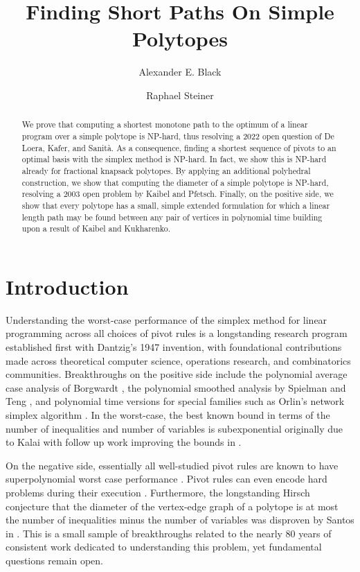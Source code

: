 \documentclass[centering,11pt,reqno]{amsart}
\title{Finding Short Paths On Simple Polytopes}
\author[Black]{Alexander E. Black}
\author[Steiner]{Raphael Steiner}
\theoremstyle{definition}
\newcommand{\NP}{\textsc{NP}}
\begin{document}
	
\maketitle


\begin{abstract}  
We prove that computing a shortest monotone path to the optimum of a linear program over a simple polytope is \NP-hard, thus resolving a 2022 open question of De Loera, Kafer, and Sanit\`{a}. As a consequence, finding a shortest sequence of pivots to an optimal basis with the simplex method is \NP-hard. In fact, we show this is \NP-hard already for fractional knapsack polytopes. By applying an additional polyhedral construction, we show that computing the diameter of a simple polytope is \NP-hard, resolving a 2003 open problem by Kaibel and Pfetsch. Finally, on the positive side, we show that every polytope has a small, simple extended formulation for which a linear length path may be found between any pair of vertices in polynomial time building upon a result of Kaibel and Kukharenko.
\end{abstract}


\section{Introduction}

Understanding the worst-case performance of the simplex method for linear programming across all choices of pivot rules is a longstanding research program established first with Dantzig's 1947 invention, with foundational contributions made across theoretical computer science, operations research, and combinatorics communities. Breakthroughs on the positive side include the polynomial average case analysis of Borgwardt \cite{b87}, the polynomial smoothed analysis by Spielman and Teng \cite{ST04}, and polynomial time versions for special families such as Orlin's network simplex algorithm \cite{OrlinFlows}. In the worst-case, the best known bound in terms of the number of inequalities and number of variables is subexponential originally due to Kalai \cite{k92} with follow up work improving the bounds in \cite{hz15}.

On the negative side, essentially all well-studied pivot rules are known to have superpolynomial worst case performance \cite{km72, jer73, AC78, GS79, Mur80, g83, k92,msw96, jour/cm/AZ98, conf/stoc/FHZ11, conf/ipco/Friedmann11,hz15, disser2020exponential, dissermosis, black2024exponentiallowerboundspivot, disserSTACS}. Pivot rules can even encode hard problems during their execution \cite{NPmighty, NPHardDuringExecution1, NPHardDuringExecution2}. Furthermore, the longstanding Hirsch conjecture that the diameter of the vertex-edge graph of a polytope is at most the number of inequalities minus the number of variables was disproven by Santos in \cite{HirschSolution}. This is a small sample of breakthroughs related to the nearly 80 years of consistent work dedicated to understanding this problem, yet fundamental questions remain open. 
\end{document}
